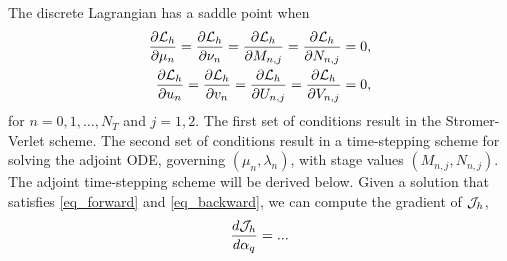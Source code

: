 \documentclass[11pt]{article}
\begin{document}
The discrete Lagrangian has a saddle point when
\begin{align}
  \frac{\partial{\cal L}_h}{\partial \mu_n} =
  \frac{\partial{\cal L}_h}{\partial \nu_n} =
  \frac{\partial{\cal L}_h}{\partial M_{n,j}} =
  \frac{\partial{\cal L}_h}{\partial N_{n,j}} &= 0,\label{eq_forward}\\
  \frac{\partial{\cal L}_h}{\partial u_n} =
  \frac{\partial{\cal L}_h}{\partial v_n} =
  \frac{\partial{\cal L}_h}{\partial U_{n,j}} =
  \frac{\partial{\cal L}_h}{\partial V_{n,j}} &= 0,\label{eq_backward}
\end{align}
for $n=0,1,\ldots,N_T$ and $j=1,2$. The first set of conditions result in the Stromer-Verlet
scheme. The second set of conditions result in a time-stepping scheme for solving the adjoint ODE, governing
$(\mu_n, \lambda_n)$, with stage values $(M_{n,j}, N_{n,j})$. The adjoint time-stepping scheme will
be derived below. Given a solution that satisfies \eqref{eq_forward} and \eqref{eq_backward}, we can
compute the gradient of ${\cal J}_h$,
\[
\frac{d{\cal J}_h}{d\alpha_q} = ...
\]



\end{document}
